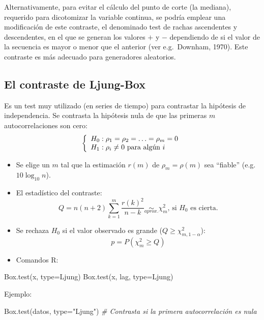 \documentclass[
]{book}
\newenvironment{Shaded}{\begin{snugshade}}{\end{snugshade}}
\newcommand{\AttributeTok}[1]{\textcolor[rgb]{0.77,0.63,0.00}{#1}}
\newcommand{\CommentTok}[1]{\textcolor[rgb]{0.56,0.35,0.01}{\textit{#1}}}
\newcommand{\FunctionTok}[1]{\textcolor[rgb]{0.00,0.00,0.00}{#1}}
\newcommand{\NormalTok}[1]{#1}
\newcommand{\StringTok}[1]{\textcolor[rgb]{0.31,0.60,0.02}{#1}}
\theoremstyle{break}
\theoremstyle{nonumberplain}
\begin{document}
Alternativamente, para evitar el cálculo del punto de corte (la mediana), requerido para dicotomizar la variable continua, se podría emplear una modificación de este contraste, el denominado test de rachas ascendentes y descendentes, en el que se generan los valores \(+\) y \(-\) dependiendo de si el valor de la secuencia es mayor o menor que el anterior (ver e.g.~Downham, 1970). Este contraste es más adecuado para generadores aleatorios.

\hypertarget{el-contraste-de-ljung-box}{%
\subsection{El contraste de Ljung-Box}\label{el-contraste-de-ljung-box}}

Es un test muy utilizado (en series de tiempo) para contrastar la
hipótesis de independencia.
Se contrasta la hipótesis nula de que las primeras \(m\)
autocorrelaciones son cero:
\[\left\{\begin{array}[c]{l}
    H_{0}:\rho_{1}=\rho_{2}=\ldots=\rho_{m}=0\\
    H_{1}:\rho_{i}\neq0\text{ para algún } i
\end{array}
\right.\]

\begin{itemize}
\item
  Se elige un \(m\) tal que la estimación \(r(m)\) de
  \(\rho_{m}=\rho(m)\) sea ``fiable'' (e.g.~\(10\log_{10}n\)).
\item
  El estadístico del contraste:
  \[Q=n(n+2)\sum_{k=1}^{m}\frac{r(k)^{2}}{n-k}\underset{aprox.}{\sim}\chi
  _{m}^{2}\text{, si }H_{0}\text{ es cierta.}\]
\item
  Se rechaza \(H_{0}\) si el valor observado es grande (\(Q\geq \chi_{m,1-\alpha}^{2}\)):
  \[p=P\left(  {\chi_{m}^{2}}\geq Q\right)\]
\item
  Comandos R:
\end{itemize}

\begin{Shaded}
\begin{Highlighting}[]
    \FunctionTok{Box.test}\NormalTok{(x, }\AttributeTok{type=}\NormalTok{Ljung)}
    \FunctionTok{Box.test}\NormalTok{(x, lag, }\AttributeTok{type=}\NormalTok{Ljung)}
\end{Highlighting}
\end{Shaded}

Ejemplo:

\begin{Shaded}
\begin{Highlighting}[]
\FunctionTok{Box.test}\NormalTok{(datos, }\AttributeTok{type=}\StringTok{"Ljung"}\NormalTok{) }\CommentTok{\# Contrasta si la primera autocorrelación es nula }
\end{Highlighting}
\end{Shaded}
\end{document}
